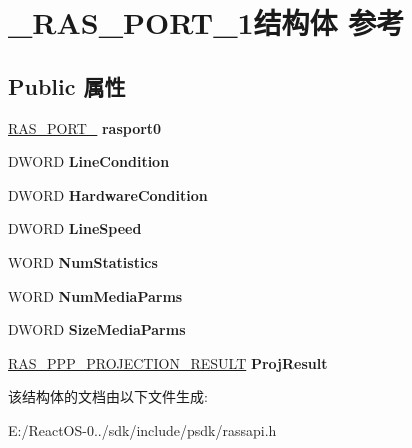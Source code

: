 \hypertarget{struct___r_a_s___p_o_r_t__1}{}\section{\+\_\+\+R\+A\+S\+\_\+\+P\+O\+R\+T\+\_\+1结构体 参考}
\label{struct___r_a_s___p_o_r_t__1}
\subsection*{Public 属性}
\begin{DoxyCompactItemize}
\item 
\mbox{\label{struct___r_a_s___p_o_r_t__1_a54d177181401c5716ba82f32101fad7e}} 
\hyperlink{struct___r_a_s___p_o_r_t__0}{R\+A\+S\+\_\+\+P\+O\+R\+T\+\_} {\bfseries rasport0}
\item 
\mbox{\label{struct___r_a_s___p_o_r_t__1_a4f77681ed3fe10742c391a25bbada22d}} 
D\+W\+O\+RD {\bfseries Line\+Condition}
\item 
\mbox{\label{struct___r_a_s___p_o_r_t__1_ac525f02bbd4fbd9751b048834ef73ea5}} 
D\+W\+O\+RD {\bfseries Hardware\+Condition}
\item 
\mbox{\label{struct___r_a_s___p_o_r_t__1_a152f181de5dd6e0a1d7cf34a0a60b87e}} 
D\+W\+O\+RD {\bfseries Line\+Speed}
\item 
\mbox{\label{struct___r_a_s___p_o_r_t__1_a3ac325ae3987fbd37069b9c4712fcbc7}} 
W\+O\+RD {\bfseries Num\+Statistics}
\item 
\mbox{\label{struct___r_a_s___p_o_r_t__1_af5a8714e46a84ab887338ae714d0926f}} 
W\+O\+RD {\bfseries Num\+Media\+Parms}
\item 
\mbox{\label{struct___r_a_s___p_o_r_t__1_a0c8c4c68a762b77c7c000a5f57110b81}} 
D\+W\+O\+RD {\bfseries Size\+Media\+Parms}
\item 
\mbox{\label{struct___r_a_s___p_o_r_t__1_a702de40441b01fd022c7b6555d2c86fe}} 
\hyperlink{struct___r_a_s___p_p_p___p_r_o_j_e_c_t_i_o_n___r_e_s_u_l_t}{R\+A\+S\+\_\+\+P\+P\+P\+\_\+\+P\+R\+O\+J\+E\+C\+T\+I\+O\+N\+\_\+\+R\+E\+S\+U\+LT} {\bfseries Proj\+Result}
\end{DoxyCompactItemize}


该结构体的文档由以下文件生成\+:\begin{DoxyCompactItemize}
\item 
E\+:/\+React\+O\+S-\/0../sdk/include/psdk/rassapi.\+h\end{DoxyCompactItemize}
